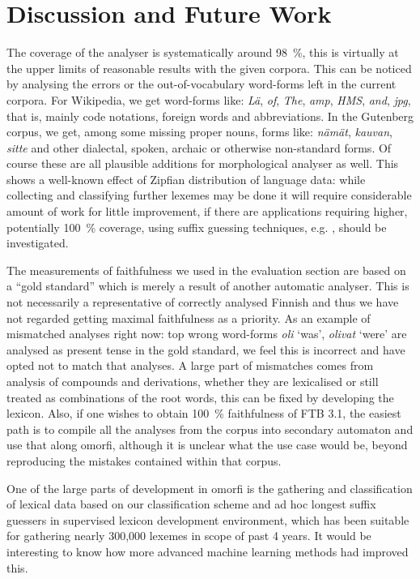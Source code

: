 \documentclass[a4paper,12pt]{article}
\begin{document}
\section{Discussion and Future Work}
\label{sec:discussion}

The coverage of the analyser is systematically around 98~\%, this is virtually
at the upper limits of reasonable results with the given corpora. This can be
noticed by analysing the errors or the out-of-vocabulary word-forms left in the
current corpora. For Wikipedia, we get word-forms like: \emph{Lä}, \emph{of},
\emph{The}, \emph{amp}, \emph{HMS}, \emph{and}, \emph{jpg}, that is, mainly
code notations, foreign words and abbreviations. In the Gutenberg corpus, we
get, among some missing proper nouns, forms like: \emph{nämät}, \emph{kauvan},
\emph{sitte} and other dialectal, spoken, archaic or otherwise non-standard
forms. Of course these are all plausible additions for morphological analyser
as well. This shows a well-known effect of Zipfian distribution of language
data: while collecting and classifying further lexemes may be done it will
require considerable amount of work for little improvement, if there are
applications requiring higher, potentially 100~\% coverage, using suffix
guessing techniques, e.g. \citet{}, should be investigated.

The measurements of faithfulness we used in the evaluation section are based on
a ``gold standard'' which is merely a result of another automatic analyser.
This is not necessarily a representative of correctly analysed Finnish and thus
we have not regarded getting maximal faithfulness as a priority. As an example
of mismatched analyses right now: top wrong word-forms \emph{oli} `was',
\emph{olivat} `were' are analysed as present tense in the gold standard, we
feel this is incorrect and have opted not to match that analyses. A large part
of mismatches comes from analysis of compounds and derivations, whether they
are lexicalised or still treated as combinations of the root words, this can be
fixed by developing the lexicon.  Also, if one wishes to obtain 100~\%
faithfulness of FTB 3.1, the easiest path is to compile all the analyses from
the corpus into secondary automaton and use that along omorfi, although it is
unclear what the use case would be, beyond reproducing the mistakes contained
within that corpus.

One of the large parts of development in omorfi is the gathering and
classification of lexical data based on our classification scheme and ad hoc
longest suffix guessers in supervised lexicon development environment, which
has been suitable for gathering nearly 300,000 lexemes in scope of
past 4 years. It would be interesting to know how more advanced machine learning
methods had improved this.
\end{document}
